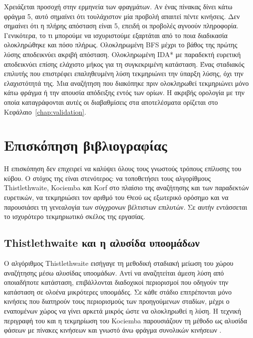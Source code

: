 Χρειάζεται προσοχή στην ερμηνεία των φραγμάτων. Αν ένας πίνακας δίνει κάτω φράγμα 5, αυτό σημαίνει ότι τουλάχιστον μία προβολή απαιτεί πέντε κινήσεις. Δεν σημαίνει ότι η πλήρης απόσταση είναι 5, επειδή οι προβολές αγνοούν πληροφορία. Γενικότερα, το τι μπορούμε να ισχυριστούμε εξαρτάται από το ποια διαδικασία ολοκληρώθηκε και πόσο πλήρως. Ολοκληρωμένη BFS μέχρι το βάθος της πρώτης λύσης αποδεικνύει ακριβή απόσταση. Ολοκληρωμένη IDA* με παραδεκτή ευρετική αποδεικνύει επίσης ελάχιστο μήκος για τη συγκεκριμένη κατάσταση. Ένας σταδιακός επιλυτής που επιστρέφει επαληθευμένη λύση τεκμηριώνει την ύπαρξη λύσης, όχι την ελαχιστότητά της. Μια αναζήτηση που διακόπηκε πριν ολοκληρωθεί τεκμηριώνει μόνο κάτω φράγμα ή την απουσία απόδειξης εντός των ορίων. Η ακριβής ορολογία με την οποία καταγράφονται αυτές οι διαβαθμίσεις στα αποτελέσματα ορίζεται στο Κεφάλαιο~\ref{chap:validation}.

\section{Επισκόπηση βιβλιογραφίας}
\label{sec:background-literature}

Η επισκόπηση δεν επιχειρεί να καλύψει όλους τους γνωστούς τρόπους επίλυσης του κύβου. Ο στόχος της είναι στενότερος: να τοποθετήσει τους αλγορίθμους Thistlethwaite, Kociemba και Korf στο πλαίσιο της αναζήτησης και των παραδεκτών ευρετικών, να τεκμηριώσει τον αριθμό του Θεού ως εξωτερικό ορόσημο και να παρουσιάσει τη γενεαλογία των σύγχρονων βέλτιστων επιλυτών. Σε αυτήν εντάσσεται το ισχυρότερο τεκμηριωτικό σκέλος της εργασίας.

\subsection{Thistlethwaite και η αλυσίδα υποομάδων}
\label{sec:background-thistlethwaite}

Ο αλγόριθμος Thistlethwaite εισήγαγε τη μεθοδική σταδιακή μείωση του χώρου αναζήτησης μέσω αλυσίδας υποομάδων. Αντί να αναζητείται άμεση λύση από οποιαδήποτε κατάσταση, επιβάλλονται διαδοχικοί περιορισμοί που οδηγούν την κατάσταση σε ολοένα μικρότερες υποομάδες. Σε κάθε στάδιο επιτρέπονται μόνο κινήσεις που διατηρούν τους περιορισμούς των προηγούμενων σταδίων, μέχρι ο εναπομένων χώρος να γίνει αρκετά μικρός ώστε να ολοκληρωθεί η λύση. Η τεχνική περιγραφή του  και η τεκμηρίωση του Kociemba παρουσιάζουν τη μέθοδο ως αλυσίδα φάσεων με πίνακες κινήσεων και γνωστό άνω φράγμα συνολικών κινήσεων \cite{scherphuisThistlethwaite,kociembaImplementationDetails}.

